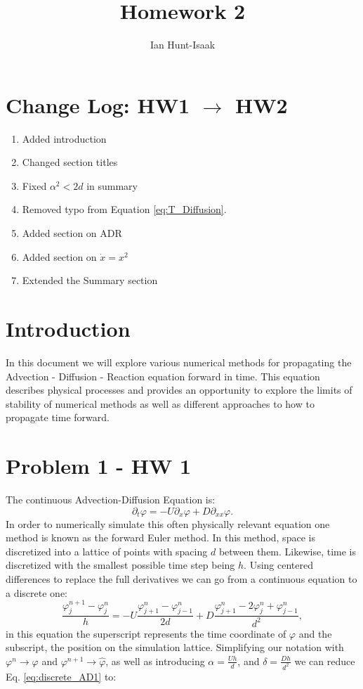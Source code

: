 \documentclass[]{article}
\title{Homework 2}
\author{Ian Hunt-Isaak}
\date{}
\begin{document}
\maketitle

\section{Change Log: HW1 $\to$ HW2}
\begin{enumerate}
	\item Added introduction
	\item Changed section titles
	\item Fixed $\alpha^2 < 2d$ in summary
	\item Removed typo from Equation \ref{eq:T_Diffusion}.
	\item Added section on ADR
	\item Added section on $\dot{x} = x^2$
	\item Extended the Summary section
\end{enumerate}
\section{Introduction}
In this document we will explore various numerical methods for propagating the Advection - Diffusion - Reaction equation forward in time. This equation describes physical processes and provides an opportunity to explore the limits of stability of numerical methods as well as different approaches to how to propagate time forward. 

\section{Problem 1 - HW 1}
The continuous Advection-Diffusion Equation is:
\begin{equation}
\partial_t \varphi = -U \partial_x \varphi + D \partial_{xx}\varphi.
\label{eq:AD_cont}
\end{equation}
In order to numerically simulate this often physically relevant equation one method is known as the forward Euler method. In this method, space is discretized into a lattice of points with spacing $d$ between them. Likewise, time is discretized with the smallest possible time step being $h$. Using centered differences to replace the full derivatives we can go from a continuous equation to a discrete one:
\begin{equation}
\frac{\varphi^{n+1}_j-\varphi^n_j}{h} = -U \frac{\varphi^n_{j+1}-\varphi^n_{j-1}}{2d} + D \frac{\varphi^n_{j+1}-2\varphi^n_{j}+\varphi^n_{j-1}}{d^2},
\label{eq:discrete_AD1}
\end{equation}
in this equation the superscript represents the time coordinate of $\varphi$ and the subscript, the position on the simulation lattice. Simplifying our notation with $\varphi^n \to \varphi$ and $\varphi^{n+1} \to \hat{\varphi}$, as well as introducing $\alpha = \frac{Uh}{d}$, and $\delta=\frac{Dh}{d^2}$  we can reduce Eq. \ref{eq:discrete_AD1} to:
\end{document}

